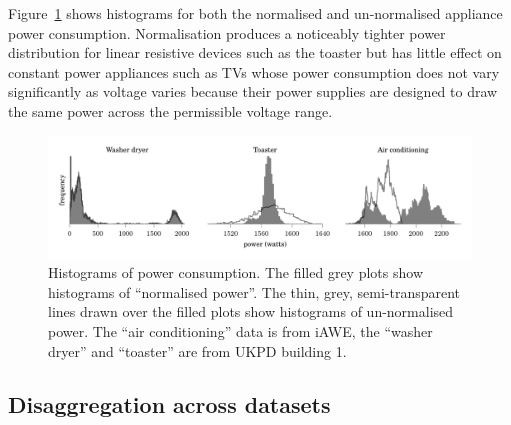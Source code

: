 \documentclass{sig-alternate}
\begin{document}
Figure~\ref{fig:power_histograms} shows
histograms for both the normalised and un-normalised appliance power
consumption. Normalisation produces a noticeably tighter power
distribution for linear resistive devices such as the toaster but has
little effect on constant power appliances such as TVs whose power consumption does
not vary significantly as voltage varies because their power supplies are designed to draw the same power across the permissible voltage range.

\begin{figure}[!t]
  \centering
  \includegraphics{figures/power_histograms.pdf} 
  \caption{Histograms of power consumption. The filled grey plots show
    histograms of ``normalised power''.  The thin, grey,
    semi-transparent lines drawn over the filled plots show histograms
    of un-normalised power.  The ``air conditioning'' data is from
    iAWE, the ``washer dryer'' and ``toaster'' are from UKPD building 1.}
  \label{fig:power_histograms} 
\end{figure}

\subsection{Disaggregation across datasets}
\end{document}

